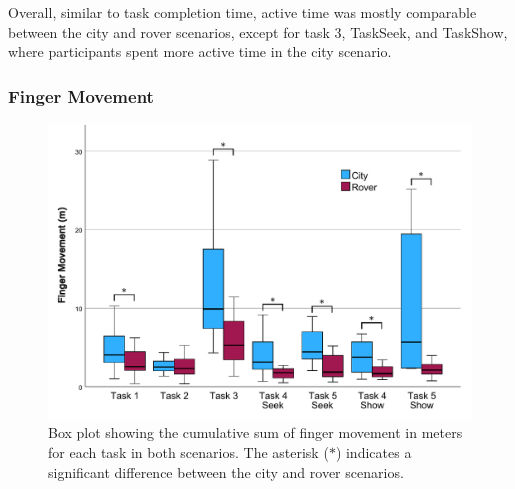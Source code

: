             Overall, similar to task completion time, active time was mostly comparable between the city and rover scenarios, except for task 3, TaskSeek, and TaskShow, where participants spent more active time in the city scenario.
        \subsubsection{Finger Movement}


            \begin{figure}[h!]
                \centering
                \includegraphics[width=1\linewidth]{figures/finger_movement_graph.pdf}
                \caption{Box plot showing the cumulative sum of finger movement in meters for each task in both scenarios. The asterisk ($\ast$) indicates a significant difference between the city and rover scenarios.}
                \label{fig:finger_movement}
            \end{figure}

